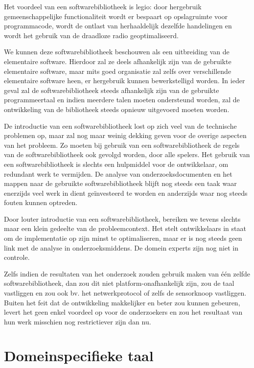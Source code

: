 Het voordeel van een softwarebibliotheek is legio: door hergebruik
gemeenschappelijke functionaliteit wordt er bespaart op opslagruimte voor
programmacode, wordt de \mcu ontlast van herhaaldelijk dezelfde handelingen en
wordt het gebruik van de draadloze radio geoptimaliseerd.

We kunnen deze softwarebibliotheek beschouwen als een uitbreiding van de
elementaire software. Hierdoor zal ze deels afhankelijk zijn van de gebruikte
elementaire software, maar mits goed organisatie zal zelfs over verschillende
elementaire software heen, er hergebruik kunnen bewerkstelligd worden. In ieder
geval zal de softwarebibliotheek steeds afhankelijk zijn van de gebruikte
programmeertaal en indien meerdere talen moeten ondersteund worden, zal de
ontwikkeling van de bibliotheek steeds opnieuw uitgevoerd moeten worden.

De introductie van een softwarebibliotheek lost op zich veel van de technische
problemen op, maar zal nog maar weinig dekking geven voor de overige aspecten
van het probleem. Zo moeten bij gebruik van een softwarebibliotheek de regels
van de softwarebibliotheek ook gevolgd worden, door alle spelers. Het gebruik
van een softwarebibliotheek is slechts een hulpmiddel voor de ontwikkelaar, om
redundant werk te vermijden. De analyse van onderzoeksdocumenten en het mappen
naar de gebruikte softwarebibliotheek blijft nog steeds een taak waar enerzijds
veel werk in dient ge\"investeerd te worden en anderzijds waar nog steeds
fouten kunnen optreden.

Door louter introductie van een softwarebibliotheek, bereiken we tevens slechts
maar een klein gedeelte van de probleemcontext. Het stelt ontwikkelaars in
staat om de implementatie op zijn minst te optimaliseren, maar er is nog steeds
geen link met de analyse in onderzoeksmiddens. De domein experts zijn nog niet
in controle.

Zelfs indien de resultaten van het onderzoek zouden gebruik maken van \'e\'en
zelfde softwarebibliotheek, dan zou dit niet platform-onafhankelijk zijn, zou
de taal vastliggen en zou ook bv. het netwerkprotocol of zelfs de sensorknoop
vastliggen. Buiten het feit dat de ontwikkeling makkelijker en beter zou kunnen
gebeuren, levert het geen enkel voordeel op voor de onderzoekers en zou het
resultaat van hun werk misschien nog restrictiever zijn dan nu.

\section{Domeinspecifieke taal}
\label{section:solution-dsl}

